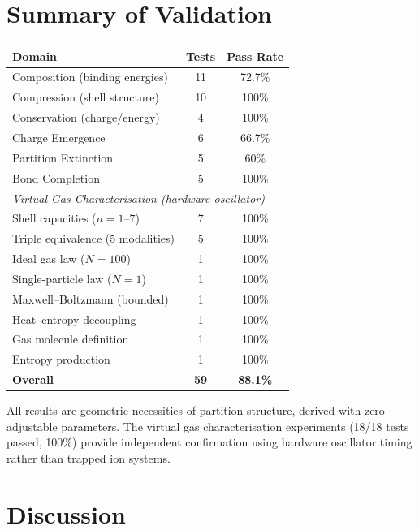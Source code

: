 \documentclass[twocolumn,10pt,a4paper]{article}
\theoremstyle{plain}
\theoremstyle{definition}
\theoremstyle{remark}
\begin{document}
\section{Summary of Validation}
\label{sec:val_summary}

\begin{center}
\begin{tabular}{lcc}
\toprule
Domain & Tests & Pass Rate \\
\midrule
Composition (binding energies) & 11 & 72.7\% \\
Compression (shell structure) & 10 & 100\% \\
Conservation (charge/energy) & 4 & 100\% \\
Charge Emergence & 6 & 66.7\% \\
Partition Extinction & 5 & 60\% \\
Bond Completion & 5 & 100\% \\
\midrule
\multicolumn{3}{l}{\emph{Virtual Gas Characterisation (hardware oscillator)}} \\
\midrule
Shell capacities ($n = 1$--$7$) & 7 & 100\% \\
Triple equivalence (5 modalities) & 5 & 100\% \\
Ideal gas law ($N = 100$) & 1 & 100\% \\
Single-particle law ($N = 1$) & 1 & 100\% \\
Maxwell--Boltzmann (bounded) & 1 & 100\% \\
Heat--entropy decoupling & 1 & 100\% \\
Gas molecule definition & 1 & 100\% \\
Entropy production & 1 & 100\% \\
\midrule
\textbf{Overall} & \textbf{59} & \textbf{88.1\%} \\
\bottomrule
\end{tabular}
\end{center}

All results are geometric necessities of partition structure, derived with zero adjustable parameters. The virtual gas characterisation experiments (18/18 tests passed, 100\%) provide independent confirmation using hardware oscillator timing rather than trapped ion systems.

\section{Discussion}
\label{sec:discussion}
\end{document}
